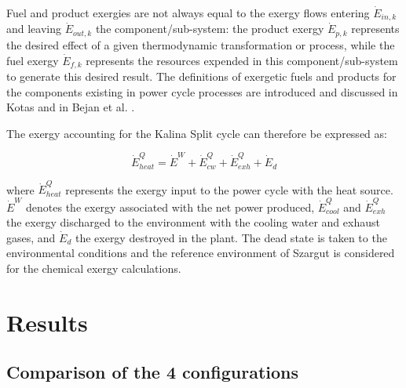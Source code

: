 \documentclass[final,times,3p]{elsarticle}
\begin{document}
\begin{itemize}
	Fuel and product exergies are not always equal to the exergy flows entering $\dot{E}_{in,k}$ and leaving $\dot{E}_{out,k}$ the component/sub-system: the product exergy $\dot{E}_{p,k}$ represents the desired effect of a given thermodynamic transformation or process, while the fuel exergy $\dot{E}_{f,k}$ represents the resources expended in this component/sub-system to generate this desired result. The definitions of exergetic fuels and products for the components existing in power cycle processes are introduced and discussed in Kotas \cite{Kotas1980,Kotas1980a,Kotas1995} and in Bejan et al. \cite{BejanAdrian;TsatsaronisGeorge;Moran1996}. 

	\end{itemize}
	

	The exergy accounting for the Kalina Split cycle can therefore be expressed as:

	\begin{equation}
		\dot{E}^{Q}_{heat}=\dot{E}^{W}+\dot{E}^{Q}_{cw}+\dot{E}^{Q}_{exh}+\dot{E}_{d}
	\end{equation}

	where $\dot{E}^{Q}_{heat}$ represents the exergy input to the power cycle with the heat source. $\dot{E}^{W}$ denotes the exergy associated with the net power produced, $\dot{E}^{Q}_{cool}$ and $\dot{E}^{Q}_{exh}$ the exergy discharged to the environment with the cooling water and exhaust gases, and $\dot{E}_{d}$ the exergy destroyed in the plant. The dead state is taken to the environmental conditions and the reference environment of Szargut \cite{Szargut1998} is considered for the chemical exergy calculations.
	

		

\section{Results}
\label{sec:results}

\subsection{Comparison of the 4 configurations}
\end{document}
